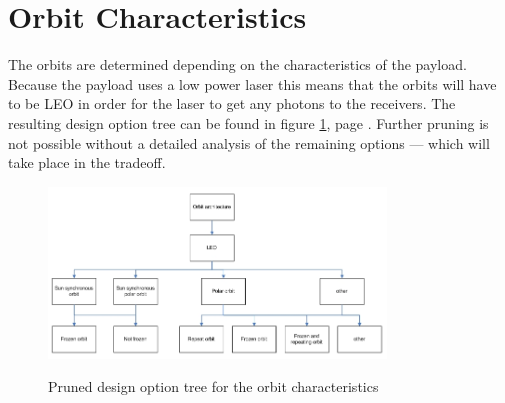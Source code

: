 \section{Orbit Characteristics}
\label{pruneOrbit}
The orbits are determined depending on the characteristics of the payload. Because the payload uses a low power laser this means that the orbits will have to be \ac{LEO} in order for the laser to get any photons to the receivers. The resulting design option tree can be found in figure \ref{fig:pruneOrbit}, page \pageref{fig:pruneOrbit}. Further pruning is not possible without a detailed analysis of the remaining options --- which will take place in the tradeoff.

\begin{figure}
\includegraphics[width=0.8\textwidth, angle=0]{chapters/img/PrunedOrbit.jpg}
\label{fig:pruneOrbit}
\caption{Pruned design option tree for the orbit characteristics}
\end{figure}